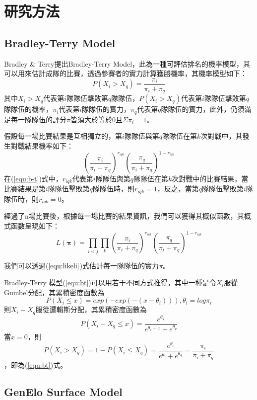 \documentclass[12pt]{article}
\begin{document}
\section{研究方法}

\subsection{Bradley-Terry Model}
Bradley \& Terry提出Bradley-Terry Model\cite{10.2307/2334029}，此為一種可評估排名的機率模型，其可以用來估計成隊的比賽，透過參賽者的實力計算獲勝機率，其機率模型如下：
\begin{equation}
P(X_i > X_q) = \dfrac{\pi_i}{\pi_i + \pi_q}
\label{equ:bt}
\end{equation}
其中$X_i>X_q$代表第$i$隊隊伍擊敗第$q$隊隊伍，$P(X_i>X_q)$代表第$i$隊隊伍擊敗第$q$隊隊伍的機率，$\pi_i$代表第$i$隊隊伍的實力，$\pi_q$代表第$q$隊隊伍的實力，此外，仍須滿足每一隊隊伍的評分$\pi$皆須大於等於0且$\Sigma{\pi_i}=1$。

假設每一場比賽結果是互相獨立的，第$i$隊隊伍與第$q$隊隊伍在第$k$次對戰中，其發生對戰結果機率如下：
\begin{equation}
(\dfrac{\pi_i}{\pi_i+\pi_q})^{r_{iqk}}(\dfrac{\pi_q}{\pi_i + \pi_q})^{1-r_{iqk}}
\label{equ:b-t}
\end{equation}
在(\ref{equ:b-t})式中，$r_{iqk}$代表第$i$隊隊伍與第$q$隊隊伍在第$k$次對戰中的比賽結果，當比賽結果是第$i$隊隊伍擊敗第$q$隊隊伍時，則$r_{iqk}=1$，反之，當第$q$隊隊伍擊敗第$i$隊隊伍時，則$r_{iqk}=0$。

經過了n場比賽後，根據每一場比賽的結果資訊，我們可以獲得其概似函數，其概式函數呈現如下：
\begin{equation}
L(\mathbf{\pi}) = \prod_{i<j}\prod_k(\dfrac{\pi_i}{\pi_i+\pi_q})^{r_{iqk}}(\dfrac{\pi_q}{\pi_i + \pi_q})^{1-r_{iqk}}
\label{equ:likeli}
\end{equation}

我們可以透過($\ref{equ:likeli}$)式估計每一隊隊伍的實力$\pi$。

Bradley-Terry 模型(\ref{equ:bt})可以用若干不同方式推得，其中一種是令$X_i$服從Gumbel分配，其累積密度函數為
\[
P(X_i \leq x) = exp(-exp(-(x-\theta_i))), \theta_i = log \pi_i
\]
則$X_i-X_q$服從邏輯斯分配，其累積密度函數為
\[
P(X_i-X_q \leq x) = \dfrac{e^{\theta_q}}{e^{\theta_i-x}+e^{\theta_q}}
\]
當$x = 0$，則
\[
P(X_i > X_q) = 1-P(X_i \leq X_q) = \dfrac{e^{\theta_i}}{e^{\theta_i}+e^{\theta_q}} = \dfrac{{\pi_i}}{{\pi_i}+{\pi_q}}
\]，即為(\ref{equ:bt})式。
\subsection{GenElo Surface Model}
\end{document}
